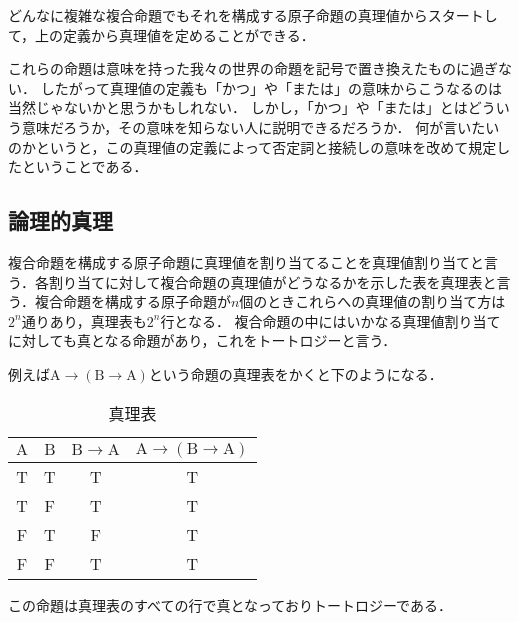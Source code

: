 \documentclass[10pt,b5paper,papersize,dvipdfmx]{jsbook}
\newcommand\rmA{\mathrm{A}}
\newcommand\rmB{\mathrm{B}}
\begin{document}
どんなに複雑な複合命題でもそれを構成する原子命題の真理値からスタートして，上の定義から真理値を定めることができる．\par
これらの命題は意味を持った我々の世界の命題を記号で置き換えたものに過ぎない．
したがって真理値の定義も「かつ」や「または」の意味からこうなるのは当然じゃないかと思うかもしれない．
しかし，「かつ」や「または」とはどういう意味だろうか，その意味を知らない人に説明できるだろうか．
何が言いたいのかというと，この真理値の定義によって否定詞と接続しの意味を改めて規定したということである．

\subsection{論理的真理}
複合命題を構成する原子命題に真理値を割り当てることを真理値割り当てと言う．各割り当てに対して複合命題の真理値がどうなるかを示した表を真理表と言う．複合命題を構成する原子命題が$n$個のときこれらへの真理値の割り当て方は$2^n$通りあり，真理表も$2^n$行となる．
複合命題の中にはいかなる真理値割り当てに対しても真となる命題があり，これをトートロジーと言う．\par
例えば$\rmA \to (\rmB \to \rmA)$という命題の真理表をかくと下のようになる．
\begin{table}[H]
  \centering
  \caption{真理表}
  \begin{tabular}{cc|cc}\hline
    $\rmA$ & $\rmB$ & $\rmB \to \rmA$ &$\rmA \to (\rmB \to \rmA)$ \\ \hline
    T & T & T & T \\
    T & F & T & T \\
    F & T & F & T \\
    F & F & T & T \\ \hline
  \end{tabular}
\end{table}
この命題は真理表のすべての行で真となっておりトートロジーである．
\end{document}
